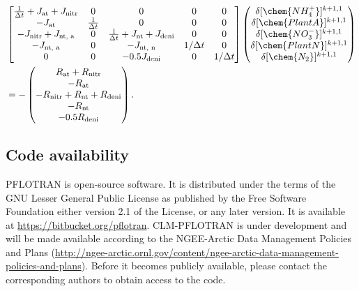 \documentclass[gmdd, online, hvmath]{copernicus}
\begin{document}
\begin{align}
\nonumber
 &
\left[
\begin{matrix}
\frac{1}{\Delta t} + J_{\text{at}} + J_{\text{nitr}} & 0                  & 0                                                    & 0          & 0         \\
-J_{\text{at}}                                       & \frac{1}{\Delta t} & 0                                                    & 0          & 0         \\
-J_{\text{nitr}} + J_{\text{nt, a}}                  & 0                  & \frac{1}{\Delta t} + J_{\text{nt}} + J_{\text{deni}} & 0          & 0         \\
-J_{\text{nt, a}}                                    & 0                  & -J_{\text{nt, n}}                                    & 1/\Delta t & 0         \\
0                                                    & 0                  & -0.5J_{\text{deni}}                                  & 0          & 1/\Delta t
\end{matrix}
\right]
\left(\begin{matrix}
\delta [\chem{NH_4^+}]^{k+1,1} \\
\delta [\chem{PlantA}]^{k+1,1} \\
\delta [\chem{NO_3^-}]^{k+1,1} \\
\delta [\chem{PlantN}]^{k+1,1} \\
\delta [\chem{N_2}]^{k+1,1}
\end{matrix}
\right)
\\
%
&=-
\left(\begin{matrix}
R_{\text{at}} + R_{\text{nitr}} \\
-R_{\text{at}} \\
-R_{\text{nitr}} + R_{\text{nt}} + R_{\text{deni}} \\
-R_{\text{nt}} \\
-0.5R_{\text{deni}}
\end{matrix}
\right).
\label{eq:complexjacobian}
\end{align}%



\subsection*{Code availability}
PFLOTRAN is open-source
      software. It is distributed under the terms of the GNU Lesser General
      Public License as published by the Free Software Foundation either
      version 2.1 of the License, or any later version. It is available at
      \url{https://bitbucket.org/pflotran}. CLM-PFLOTRAN is under
      development and will be made available according to the NGEE-Arctic
      Data Management Policies and Plans
      (\url{http://ngee-arctic.ornl.gov/content/ngee-arctic-data-management-policies-and-plans}).
      Before it becomes publicly available, please contact the corresponding
      authors to obtain access to the code.
\end{document}
